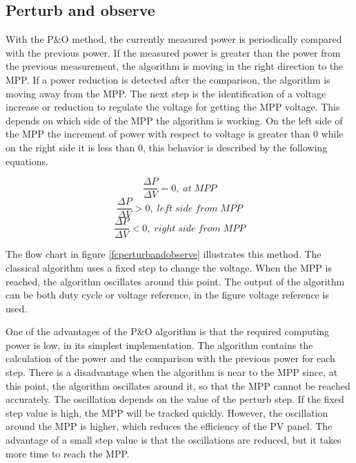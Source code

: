 

\subsection{Perturb and observe}
With the P\&O method, the currently measured power is periodically compared with the previous power. If the measured power is greater than the power from the previous measurement, the algorithm is moving in the right direction to the MPP. If a power reduction is detected after the comparison, the algorithm is moving away from the MPP. The next step is the identification of a voltage increase or reduction to regulate the voltage for getting the MPP voltage.
This depends on which side of the MPP the algorithm is working.
On the left side of the MPP the increment of power with respect to voltage is greater than 0 while on the right side it is less than 0, this behavior is described by the following equations. \cite{AN1521_MC}

\begin{equation} \label{PO1}
\frac{\Delta P}{\Delta V} = 0 ,\; at\; MPP 
\end{equation} 
\begin{equation} \label{PO2}
\frac{\Delta P}{\Delta V} > 0 ,\; left\; side\; from\; MPP 
\end{equation}
\begin{equation} \label{PO3}
\frac{\Delta P}{\Delta V} < 0 ,\; right\; side\; from\; MPP
\end{equation}


The flow chart in figure \ref{fcperturbandobserve} illustrates this method. The classical algorithm uses a fixed step to change the voltage. When the MPP is reached, the algorithm oscillates around this point. The output of the algorithm can be both duty cycle or voltage reference, in the figure voltage reference is used. \cite{flowchartVC}

One of the advantages of the P\&O algorithm is that the required computing power is  low, in its simplest implementation. The algorithm contains the calculation of the power and the comparison with the previous power for each step. There is a disadvantage when the algorithm is near to the MPP since, at this point, the algorithm oscillates around it, so that the MPP cannot be reached accurately. The oscillation depends on the value of the perturb step. If the fixed step value is high, the MPP will be tracked quickly. However, the oscillation around the MPP is higher, which reduces the efficiency of the PV panel. The advantage of a small step value is that the oscillations are reduced, but it takes more time to reach the MPP. \cite{AN1521_MC}

